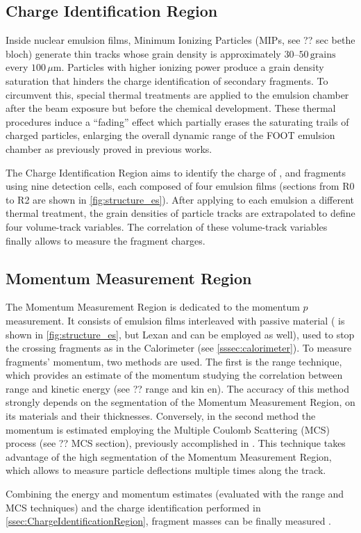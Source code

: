 \subsection{Charge Identification Region}\label{ssec:ChargeIdentificationRegion}
Inside nuclear emulsion films, Minimum Ionizing Particles (MIPs, see ?? sec bethe bloch) generate thin tracks whose grain density is approximately $30$--$50\,\mathrm{grains}$ every $100\,\mu\mathrm{m}$. Particles with higher ionizing power produce a grain density saturation that hinders the charge identification of secondary fragments. To circumvent this, special thermal treatments are applied to the emulsion chamber after the beam exposure but before the chemical development. These thermal procedures induce a ``fading'' effect which partially erases the saturating trails of charged particles, enlarging the overall dynamic range of the FOOT emulsion chamber as previously proved in \cite{ionChargeSep,articleLellis1,articleLellis2} previous works.

The Charge Identification Region aims to identify the charge of ,  and  fragments using nine detection cells, each composed of four emulsion films (sections from R0 to R2 are shown in \autoref{fig:structure_es}). After applying to each emulsion a different thermal treatment, the grain densities of particle tracks are extrapolated to define four volume-track variables. The correlation of these volume-track variables finally allows to measure the fragment charges.
\subsection{Momentum Measurement Region}\label{ssec:MomentumMeasurementRegion}
The Momentum Measurement Region is dedicated to the momentum $p$ measurement. It consists of emulsion films interleaved with passive material ( is shown in \autoref{fig:structure_es}, but Lexan and  can be employed as well), used to stop the crossing fragments as in the Calorimeter (see \autoref{sssec:calorimeter}). To measure fragments' momentum, two methods are used. The first is the range technique, which provides an estimate of the momentum studying the correlation between range and kinetic energy (see ?? range and kin en). The accuracy of this method strongly depends on the segmentation of the Momentum Measurement Region, on its materials and their thicknesses. Conversely, in the second method the momentum is estimated employing the Multiple Coulomb Scattering (MCS) process (see ?? MCS section), previously accomplished in \cite{Agafonova_2012,DESERIO2003539}. This technique takes advantage of the high segmentation of the Momentum Measurement Region, which allows to measure particle deflections multiple times along the track.

Combining the energy and momentum estimates (evaluated with the range and MCS techniques) and the charge identification performed in \autoref{ssec:ChargeIdentificationRegion}, fragment masses can be finally measured \cite{measurement_impact_foot}.














